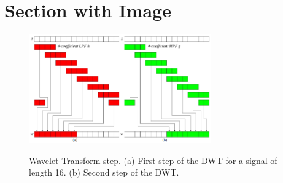 \documentclass{article}
\begin{document}
	\section{Section with Image}
	\FloatBarrier
	\begin{figure}[h]
		\caption{Wavelet Transform step. (a) First step of the DWT for a signal of length 16. (b) Second step of the DWT.}
		\centering
		\includegraphics[width=0.7\textwidth]{imgs/waveletstep}
		\label{fig:waveletstep}
	\end{figure}
	\FloatBarrier
	
	 
	 
	
	\appendix
\end{document}
